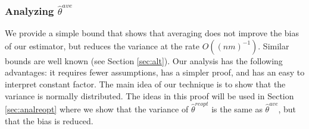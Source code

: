 \documentclass[twoside]{article}
\newtheorem{lemma}{Lemma}
\newcommand{\zero}{\text{\textbf{0}}}
\newcommand{\E}{\mathbb{E}}
\newcommand{\w}{\theta}
\newcommand{\wreopt}{\hat\w^{reopt}}
\newcommand{\wave}{\hat\w^{ave}}
\newcommand{\wmle}{\hat\w^{mle}}
\newcommand{\wstar}{{\w^{*}}}
\newcommand{\normal}[2]{\ensuremath{\mathcal{N}\left({{#1}},{{#2}}\right)}}
\newcommand{\ltwo}[1]{{\left\lVert {#1} \right\rVert}}
\newcommand{\ignore}[1]{}
\begin{document}
\subsubsection{Analyzing $\wave$}

We provide a simple bound that shows that averaging does not improve the bias of our estimator,
but reduces the variance at the rate $O((nm)^{-1})$.
Similar bounds are well known (see Section \ref{sec:alt}).
Our analysis has the following advantages:
it requires fewer assumptions, has a simpler proof, and has an easy to interpret constant factor.
The main idea of our technique is to show that the variance is normally distributed.
The ideas in this proof will be used in Section \ref{sec:analreopt} where we show that the variance of $\wreopt$ is the same as $\wave$, but that the bias is reduced.

\ignore{
\begin{lemma}
We have that
\begin{equation}
\E\ltwo{\wstar-\wave}^2
\le
\E\ltwo{\wstar-\E\wmle_i}^2
+
\frac{1}{m}\E\ltwo{\E\wmle_i-\wmle_i}^2
\end{equation}
\end{lemma}
\begin{proof}
It is well known that the MSE of an estimator is the sum of its bias and variance.
That is,
\begin{equation}
\E\ltwo{\wstar-\wave}^2
=
\E\ltwo{\wstar-\E\wave}^2
+
\E\ltwo{\E\wave-\wave}^2
\end{equation}
First we consider the bias.
By the linearity of expectation, we have that
\begin{align}
\E\wave
&=
\E\frac{1}{m}\sum_{i=1}^m\wmle_i
=
\frac{1}{m}\sum_{i=1}^m\E\wmle_i
=
\E\wmle_i
\label{eq:expwave}
\end{align}
and so the bias
$
\E\ltwo{\wstar-\E\wave}^2
=
\E\ltwo{\wstar-\E\wmle_i}^2
$.
In words, the bias of the averaging estimator is the same as the bias of the estimator on an individual machine.

Next we consider the variance.
We use the definition of $\wave$ and Equation \ref{eq:expwave} above to conclude that
\begin{align}
\wave-\E\wave
&=
\frac{1}{m}\sum_{i=1}^m\wmle_i-\E\wave
\\&=
\frac{1}{m}\sum_{i=1}^m\left(\wmle_i-\E\wave\right)
\\&=
\frac{1}{m}\sum_{i=1}^m\left(\wmle_i-\E\wmle_i\right)
\end{align}
Taking the norm and squaring both sides gives
\begin{equation}
\ltwo{\wave-\E\wave}
=
\ltwo{
\frac{1}{m}\sum_{i=1}^m\left(\wmle_i-\E\wmle_i\right)
}
\end{equation}
\end{proof}
}
\end{document}
